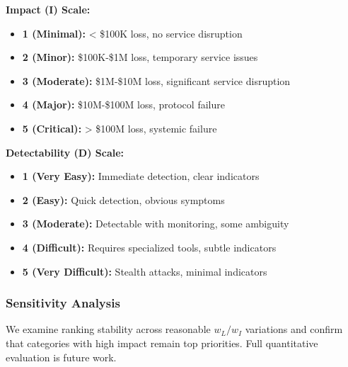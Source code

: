 \textbf{Impact (I) Scale:}
\begin{itemize}
    \item \textbf{1 (Minimal):} < \$100K loss, no service disruption
    \item \textbf{2 (Minor):} \$100K-\$1M loss, temporary service issues
    \item \textbf{3 (Moderate):} \$1M-\$10M loss, significant service disruption
    \item \textbf{4 (Major):} \$10M-\$100M loss, protocol failure
    \item \textbf{5 (Critical):} > \$100M loss, systemic failure
\end{itemize}

\textbf{Detectability (D) Scale:}
\begin{itemize}
    \item \textbf{1 (Very Easy):} Immediate detection, clear indicators
    \item \textbf{2 (Easy):} Quick detection, obvious symptoms
    \item \textbf{3 (Moderate):} Detectable with monitoring, some ambiguity
    \item \textbf{4 (Difficult):} Requires specialized tools, subtle indicators
    \item \textbf{5 (Very Difficult):} Stealth attacks, minimal indicators
\end{itemize}

\subsubsection{Sensitivity Analysis}
We examine ranking stability across reasonable $w_L/w_I$ variations and confirm that categories with high impact remain top priorities. Full quantitative evaluation is future work.
